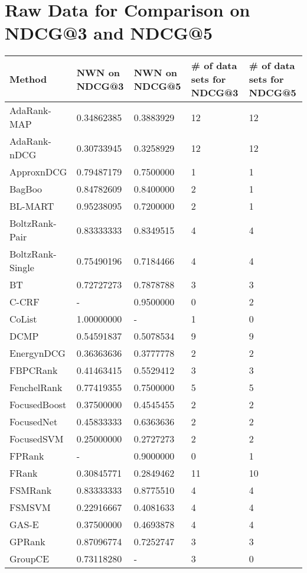 \chapter{Raw Data for Comparison on NDCG@3 and NDCG@5}
\label{app:norm_winnum_ndcg35}

\begin{longtable}{l|p{2.3cm}|p{2.3cm}|p{2.3cm}|p{2.33cm}}
Method & \acs{NWN} on \acs{NDCG}@3 & \acs{NWN} on \acs{NDCG}@5 & \# of data sets for \acs{NDCG}@3 & \# of data sets for \acs{NDCG}@5\\
\hline
AdaRank-\acs{MAP} & 0.34862385 & 0.3883929 & 12 & 12\\ 
AdaRank-\acs{nDCG} & 0.30733945 & 0.3258929 & 12 & 12 \\ 
Approx\acs{nDCG} & 0.79487179 & 0.7500000 & 1 & 1 \\ 
BagBoo & 0.84782609 & 0.8400000 & 2 & 1\\ 
BL-MART & 0.95238095 & 0.7200000& 2 & 1\\ 
BoltzRank-Pair & 0.83333333 & 0.8349515 & 4 & 4\\ 
BoltzRank-Single & 0.75490196 & 0.7184466 & 4 & 4\\ 
BT & 0.72727273 & 0.7878788 & 3 & 3\\
C-\acs{CRF} & - & 0.9500000 & 0 & 2 \\  
CoList & 1.00000000 & - & 1 & 0 \\ 
DCMP & 0.54591837 & 0.5078534 & 9 & 9 \\ 
Energy\acs{nDCG} & 0.36363636 & 0.3777778 & 2 & 2\\ 
FBPCRank & 0.41463415 & 0.5529412 & 3 & 3 \\ 
FenchelRank & 0.77419355 & 0.7500000 & 5 & 5\\ 
FocusedBoost & 0.37500000 & 0.4545455 & 2 & 2 \\ 
FocusedNet & 0.45833333 & 0.6363636 & 2 & 2 \\ 
Focused\acs{SVM} & 0.25000000 & 0.2727273 & 2 & 2 \\
FPRank & - & 0.9000000 & 0 & 1 \\
FRank & 0.30845771 & 0.2849462 & 11 & 10 \\ 
FSMRank & 0.83333333 & 0.8775510 & 4 & 4\\ 
FSM\acs{SVM} & 0.22916667 & 0.4081633 & 4 & 4 \\ 
GAS-E & 0.37500000 & 0.4693878 & 4 & 4\\ 
\acs{GP}Rank & 0.87096774 & 0.7252747 & 3 & 3 \\ 
GroupCE & 0.73118280 & - & 3 & 0\\ 

\end{longtable}
